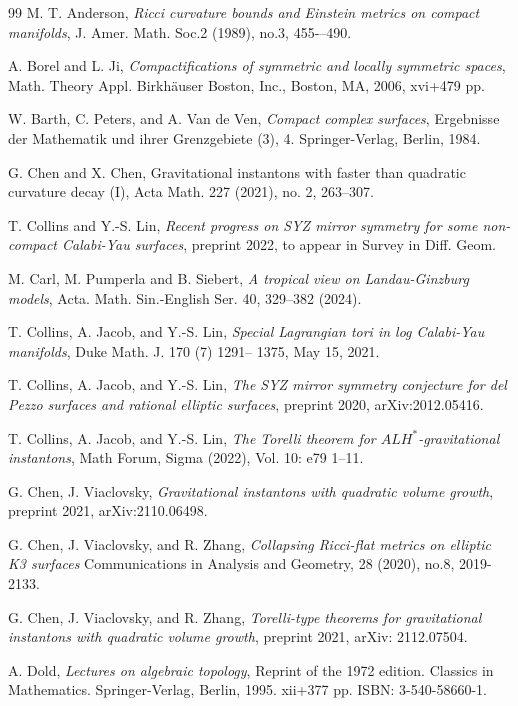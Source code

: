 \documentclass[11pt]{amsart}
\theoremstyle{plain}
\theoremstyle{definition}
\numberwithin{equation}{section}
\begin{document}
\begin{thebibliography}{99}
	 M. T. Anderson, {\em Ricci curvature bounds and Einstein metrics on compact manifolds}, J. Amer. Math. Soc.2 (1989), no.3, 455-–490.
	
	 A. Borel and L. Ji, {\em Compactifications of symmetric and locally symmetric spaces},
	Math. Theory Appl.
	Birkhäuser Boston, Inc., Boston, MA, 2006, xvi+479 pp.
	
	 W. Barth, C. Peters, and A. Van de Ven, {\em Compact complex surfaces}, Ergebnisse der Mathematik und ihrer Grenzgebiete (3), 4. Springer-Verlag, Berlin, 1984.
	
	 G. Chen and X. Chen, Gravitational instantons with faster than quadratic curvature decay (I), Acta Math. 227 (2021), no. 2, 263–307. 
	
	 T. Collins and Y.-S. Lin, {\em Recent progress on SYZ mirror symmetry for some non-compact Calabi-Yau surfaces}, preprint 2022, to appear in Survey in Diff. Geom.
	
	 M. Carl, M. Pumperla and B. Siebert, {\em A tropical view on Landau-Ginzburg models}, Acta. Math. Sin.-English Ser. 40, 329–382 (2024).
	
	 T. Collins, A. Jacob, and Y.-S. Lin, {\em Special Lagrangian tori in log Calabi-Yau manifolds}, Duke Math. J. 170 (7) 1291-- 1375, May 15, 2021.
	
	 T. Collins, A. Jacob, and Y.-S. Lin, {\em The SYZ mirror symmetry conjecture for del Pezzo surfaces and rational elliptic surfaces}, preprint 2020, arXiv:2012.05416.
	
	 T. Collins, A. Jacob, and Y.-S. Lin, {\em The Torelli theorem for $ALH^*$-gravitational instantons}, Math Forum, Sigma (2022), Vol. 10: e79 1--11.
	
	 G. Chen, J. Viaclovsky, {\em Gravitational instantons with quadratic volume growth}, preprint 2021, arXiv:2110.06498.
	
	 G. Chen, J. Viaclovsky, and R. Zhang, {\em Collapsing Ricci-flat metrics on elliptic K3 surfaces}
	Communications in Analysis and Geometry, 28 (2020), no.8, 2019-2133.
	
	  G. Chen, J. Viaclovsky, and R. Zhang, {\em Torelli-type theorems for gravitational instantons with quadratic volume growth}, preprint 2021, arXiv: 2112.07504. 
	
	 A. Dold, {\em Lectures on algebraic topology},
	Reprint of the 1972 edition. Classics in Mathematics. Springer-Verlag, Berlin, 1995. xii+377 pp. ISBN: 3-540-58660-1. 
	

\end{thebibliography}
\end{document}
